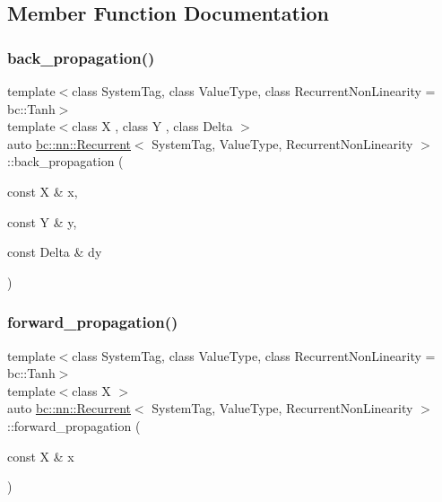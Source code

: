 \subsection{Member Function Documentation}
\mbox{\label{structbc_1_1nn_1_1Recurrent_ac30d6edec8e456e06bc967acfc87f07e}} 
\subsubsection{\texorpdfstring{back\+\_\+propagation()}{back\_propagation()}}
{\footnotesize\ttfamily template$<$class System\+Tag, class Value\+Type, class Recurrent\+Non\+Linearity = bc\+::\+Tanh$>$ \\
template$<$class X , class Y , class Delta $>$ \\
auto \hyperlink{structbc_1_1nn_1_1Recurrent}{bc\+::nn\+::\+Recurrent}$<$ System\+Tag, Value\+Type, Recurrent\+Non\+Linearity $>$\+::back\+\_\+propagation (\begin{DoxyParamCaption}\item[{const X \&}]{x,  }\item[{const Y \&}]{y,  }\item[{const Delta \&}]{dy }\end{DoxyParamCaption})\hspace{0.3cm}{\ttfamily [inline]}}

\mbox{\label{structbc_1_1nn_1_1Recurrent_ab01857476b3677586939ba2b39ab86d4}} 
\subsubsection{\texorpdfstring{forward\+\_\+propagation()}{forward\_propagation()}\hspace{0.1cm}{\footnotesize\ttfamily [1/2]}}
{\footnotesize\ttfamily template$<$class System\+Tag, class Value\+Type, class Recurrent\+Non\+Linearity = bc\+::\+Tanh$>$ \\
template$<$class X $>$ \\
auto \hyperlink{structbc_1_1nn_1_1Recurrent}{bc\+::nn\+::\+Recurrent}$<$ System\+Tag, Value\+Type, Recurrent\+Non\+Linearity $>$\+::forward\+\_\+propagation (\begin{DoxyParamCaption}\item[{const X \&}]{x }\end{DoxyParamCaption})\hspace{0.3cm}{\ttfamily [inline]}}

